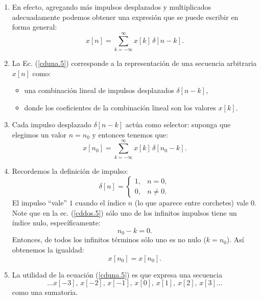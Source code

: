 \begin{enumerate}
	\item En efecto, agregando más impulsos desplazados y multiplicados adecuadamente podemos obtener una expresión que se puede escribir en forma general:
	\begin{equation}
		x[n] = \sum_{k=-\infty}^{\infty} x[k] \, \delta[n-k].
		\label{cduna.5}
	\end{equation}
	
	\item La Ec. (\ref{cduna.5}) corresponde a la representación de una secuencia arbitraria $x[n]$ como:
	\begin{itemize}
		\item una combinación lineal de impulsos desplazados $\delta[n-k]$,
		\item donde los coeficientes de la combinación lineal son los valores $x[k]$.
	\end{itemize}
	
	\item Cada impulso desplazado $\delta[n-k]$ actúa como selector: suponga que elegimos un valor $n=n_{0}$ y entonces tenemos que:
	\begin{equation}
		x[n_{0}] = \sum_{k=-\infty}^{\infty} x[k] \, \delta[n_{0}-k].
		\label{cddos.5}
	\end{equation}
	
	\item Recordemos la definición de impulso:
	\begin{equation}
		\delta[n] = \begin{cases}
			1, & n=0, \\ 
			0, & n\neq 0.
		\end{cases}
	\end{equation}
	El impulso ``vale'' $1$ cuando el índice $n$ (lo que aparece entre corchetes) vale $0$. Note que en la ec. (\ref{cddos.5}) sólo uno de los infinitos impulsos tiene un índice nulo, específicamente:
	\begin{equation}
		n_{0}-k=0.
	\end{equation}
	Entonces, de todos los infinitos términos sólo uno es no nulo ($k=n_{0}$). Así obtenemos la igualdad:
	\begin{equation}
		x[n_{0}] = x[n_{0}].
	\end{equation}
	
	\item La utilidad de la ecuación (\ref{cduna.5}) es que expresa una secuencia
	\begin{equation}
		...x[-3], \, x[-2], \, x[-1], \, x[0], \, x[1], \, x[2], \, x[3]...
	\end{equation}
	como una sumatoria.
\end{enumerate}

